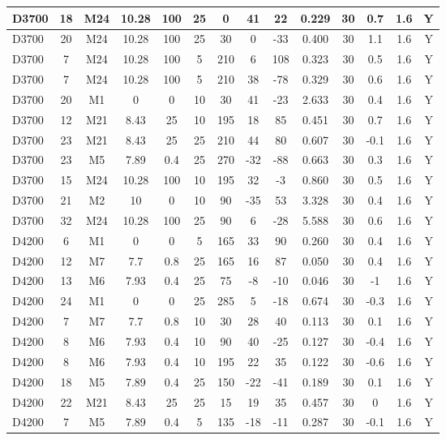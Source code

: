 \documentclass{article}
\begin{document}
\begin{center}
\begin{longtable}{|l|c|c|c|c|c|c|c|c|c|c|c|c|c|}
D3700	&	18	&	M24	&	10.28	&	100	&	25	&	0	&	41	&	22	&	0.229	&	30	&	0.7	&	1.6	&	Y	\\\hline
D3700	&	20	&	M24	&	10.28	&	100	&	25	&	30	&	0	&	-33	&	0.400	&	30	&	1.1	&	1.6	&	Y	\\\hline
D3700	&	7	&	M24	&	10.28	&	100	&	5	&	210	&	6	&	108	&	0.323	&	30	&	0.5	&	1.6	&	Y	\\\hline
D3700	&	7	&	M24	&	10.28	&	100	&	5	&	210	&	38	&	-78	&	0.329	&	30	&	0.6	&	1.6	&	Y	\\\hline
D3700	&	20	&	M1	&	0	&	0	&	10	&	30	&	41	&	-23	&	2.633	&	30	&	0.4	&	1.6	&	Y	\\\hline
D3700	&	12	&	M21	&	8.43	&	25	&	10	&	195	&	18	&	85	&	0.451	&	30	&	0.7	&	1.6	&	Y	\\\hline
D3700	&	23	&	M21	&	8.43	&	25	&	25	&	210	&	44	&	80	&	0.607	&	30	&	-0.1	&	1.6	&	Y	\\\hline
D3700	&	23	&	M5	&	7.89	&	0.4	&	25	&	270	&	-32	&	-88	&	0.663	&	30	&	0.3	&	1.6	&	Y	\\\hline
D3700	&	15	&	M24	&	10.28	&	100	&	10	&	195	&	32	&	-3	&	0.860	&	30	&	0.5	&	1.6	&	Y	\\\hline
D3700	&	21	&	M2	&	10	&	0	&	10	&	90	&	-35	&	53	&	3.328	&	30	&	0.4	&	1.6	&	Y	\\\hline
D3700	&	32	&	M24	&	10.28	&	100	&	25	&	90	&	6	&	-28	&	5.588	&	30	&	0.6	&	1.6	&	Y	\\\hline
D4200	&	6	&	M1	&	0	&	0	&	5	&	165	&	33	&	90	&	0.260	&	30	&	0.4	&	1.6	&	Y	\\\hline
D4200	&	12	&	M7	&	7.7	&	0.8	&	25	&	165	&	16	&	87	&	0.050	&	30	&	0.4	&	1.6	&	Y	\\\hline
D4200	&	13	&	M6	&	7.93	&	0.4	&	25	&	75	&	-8	&	-10	&	0.046	&	30	&	-1	&	1.6	&	Y	\\\hline
D4200	&	24	&	M1	&	0	&	0	&	25	&	285	&	5	&	-18	&	0.674	&	30	&	-0.3	&	1.6	&	Y	\\\hline
D4200	&	7	&	M7	&	7.7	&	0.8	&	10	&	30	&	28	&	40	&	0.113	&	30	&	0.1	&	1.6	&	Y	\\\hline
D4200	&	8	&	M6	&	7.93	&	0.4	&	10	&	90	&	40	&	-25	&	0.127	&	30	&	-0.4	&	1.6	&	Y	\\\hline
D4200	&	8	&	M6	&	7.93	&	0.4	&	10	&	195	&	22	&	35	&	0.122	&	30	&	-0.6	&	1.6	&	Y	\\\hline
D4200	&	18	&	M5	&	7.89	&	0.4	&	25	&	150	&	-22	&	-41	&	0.189	&	30	&	0.1	&	1.6	&	Y	\\\hline
D4200	&	22	&	M21	&	8.43	&	25	&	25	&	15	&	19	&	35	&	0.457	&	30	&	0	&	1.6	&	Y	\\\hline
D4200	&	7	&	M5	&	7.89	&	0.4	&	5	&	135	&	-18	&	-11	&	0.287	&	30	&	-0.1	&	1.6	&	Y	\\\hline

\end{longtable}
\end{center}
\end{document}
